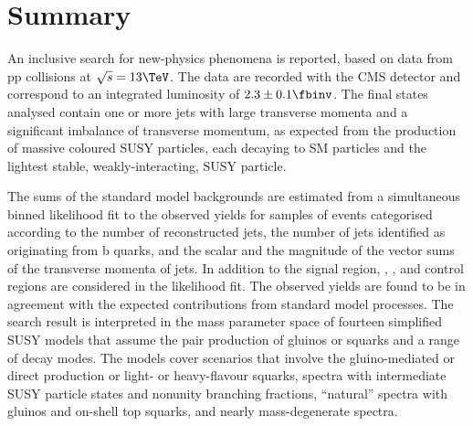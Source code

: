 \section{Summary}
\label{sec:summary}

An inclusive search for new-physics phenomena is reported, based on
data from pp collisions at $\sqrt{s} = 13\TeV$. The data are recorded
with the CMS detector and correspond to an integrated luminosity of
$2.3 \pm 0.1 \fbinv$. The final states analysed contain one or more
jets with large transverse momenta and a significant imbalance of
transverse momentum, as expected from the production of massive
coloured SUSY particles, each decaying to SM particles and the
lightest stable, weakly-interacting, SUSY particle.


The sums of the standard model backgrounds are estimated from a
simultaneous binned likelihood fit to the observed yields for samples
of events categorised according to the number of reconstructed jets,
the number of jets identified as originating from b quarks, and the
scalar and the magnitude of the vector sums of the transverse momenta
of jets. In addition to the signal region, \mj, \mmj, and \gj control
regions are considered in the likelihood fit. The observed yields are
found to be in agreement with the expected contributions from standard
model processes.  The search result is interpreted in the mass
parameter space of fourteen simplified SUSY models that assume the
pair production of gluinos or squarks and a range of decay modes. The
models cover scenarios that involve the gluino-mediated or direct
production or light- or heavy-flavour squarks, spectra with
intermediate SUSY particle states and nonunity branching fractions,
``natural'' spectra with gluinos and on-shell top squarks, and nearly
mass-degenerate spectra.

